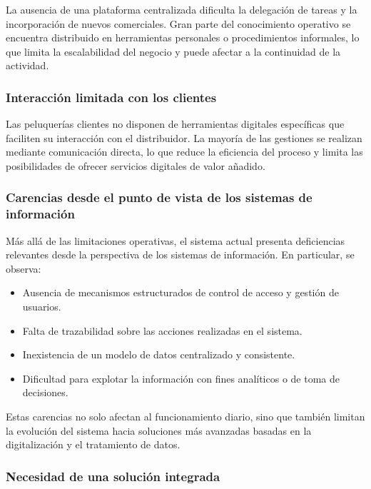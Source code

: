 La ausencia de una plataforma centralizada dificulta la delegación de tareas y la incorporación de nuevos comerciales. Gran parte del conocimiento operativo se encuentra distribuido en herramientas personales o procedimientos informales, lo que limita la escalabilidad del negocio y puede afectar a la continuidad de la actividad.

\subsubsection{Interacción limitada con los clientes}

Las peluquerías clientes no disponen de herramientas digitales específicas que faciliten su interacción con el distribuidor. La mayoría de las gestiones se realizan mediante comunicación directa, lo que reduce la eficiencia del proceso y limita las posibilidades de ofrecer servicios digitales de valor añadido.

\subsubsection{Carencias desde el punto de vista de los sistemas de información}

Más allá de las limitaciones operativas, el sistema actual presenta deficiencias relevantes desde la perspectiva de los sistemas de información. En particular, se observa:

\begin{itemize}
  \item Ausencia de mecanismos estructurados de control de acceso y gestión de usuarios.
  \item Falta de trazabilidad sobre las acciones realizadas en el sistema.
  \item Inexistencia de un modelo de datos centralizado y consistente.
  \item Dificultad para explotar la información con fines analíticos o de toma de decisiones.
\end{itemize}

Estas carencias no solo afectan al funcionamiento diario, sino que también limitan la evolución del sistema hacia soluciones más avanzadas basadas en la digitalización y el tratamiento de datos.

\subsubsection{Necesidad de una solución integrada}

